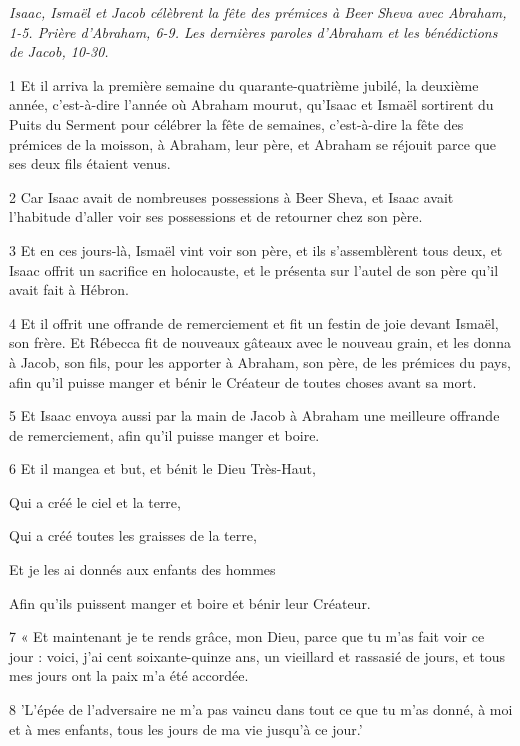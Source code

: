 
\par \textit{Isaac, Ismaël et Jacob célèbrent la fête des prémices à Beer Sheva avec Abraham, 1-5. Prière d'Abraham, 6-9. Les dernières paroles d'Abraham et les bénédictions de Jacob, 10-30.}

\par 1 Et il arriva la première semaine du quarante-quatrième jubilé, la deuxième année, c'est-à-dire l'année où Abraham mourut, qu'Isaac et Ismaël sortirent du Puits du Serment pour célébrer la fête de semaines, c'est-à-dire la fête des prémices de la moisson, à Abraham, leur père, et Abraham se réjouit parce que ses deux fils étaient venus.
\par 2 Car Isaac avait de nombreuses possessions à Beer Sheva, et Isaac avait l'habitude d'aller voir ses possessions et de retourner chez son père.
\par 3 Et en ces jours-là, Ismaël vint voir son père, et ils s'assemblèrent tous deux, et Isaac offrit un sacrifice en holocauste, et le présenta sur l'autel de son père qu'il avait fait à Hébron.
\par 4 Et il offrit une offrande de remerciement et fit un festin de joie devant Ismaël, son frère. Et Rébecca fit de nouveaux gâteaux avec le nouveau grain, et les donna à Jacob, son fils, pour les apporter à Abraham, son père, de les prémices du pays, afin qu'il puisse manger et bénir le Créateur de toutes choses avant sa mort.
\par 5 Et Isaac envoya aussi par la main de Jacob à Abraham une meilleure offrande de remerciement, afin qu'il puisse manger et boire.
\par 6 Et il mangea et but, et bénit le Dieu Très-Haut,
\par    
\par     Qui a créé le ciel et la terre,  
\par     Qui a créé toutes les graisses de la terre,  
\par     Et je les ai donnés aux enfants des hommes  
\par     Afin qu'ils puissent manger et boire et bénir leur Créateur.
\par    
\par 7 « Et maintenant je te rends grâce, mon Dieu, parce que tu m'as fait voir ce jour : voici, j'ai cent soixante-quinze ans, un vieillard et rassasié de jours, et tous mes jours ont la paix m'a été accordée.
\par 8 'L'épée de l'adversaire ne m'a pas vaincu dans tout ce que tu m'as donné, à moi et à mes enfants, tous les jours de ma vie jusqu'à ce jour.'
